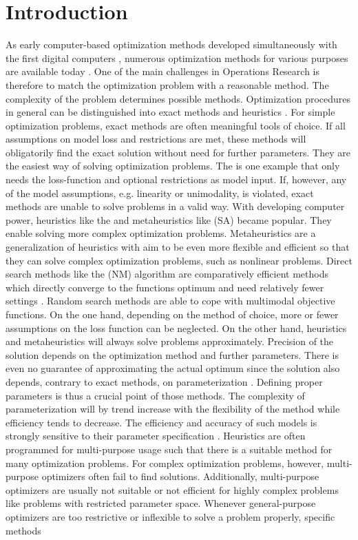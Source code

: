 \section{Introduction}
As early computer-based optimization methods developed simultaneously with the first digital computers \citep{corana_1987}, numerous optimization methods for various purposes are available today \citep{wegener_2005}. One of the main challenges in Operations Research is therefore to match the optimization problem with a reasonable method. The complexity of the problem determines possible methods. Optimization procedures in general can be distinguished into exact methods and heuristics \citep{kirkpatrick_1983}. For simple optimization problems, exact methods are often meaningful tools of choice. If all assumptions on model loss and restrictions are met, these methods will obligatorily find the exact solution without need for further parameters. They are the easiest way of solving optimization problems.  The  \citep{dantzig_1959} is  one example that only needs the loss-function and optional restrictions as model input. If, however, any of the model assumptions, e.g. linearity or unimodality, is violated, exact methods are unable to solve problems in a valid way. With developing computer power, heuristics like the   \citep{clarke_1964} and metaheuristics like  (SA) \citep{kirkpatrick_1983} became popular. They enable solving more complex optimization problems. Metaheuristics are a generalization of heuristics with aim to be even more flexible and efficient \citep{blum_2003} so that they can solve complex optimization problems, such as nonlinear problems. Direct search methods like the  (NM) algorithm are comparatively efficient methods which directly converge to the functions optimum and need relatively fewer settings \citep{geiger_1999}. Random search methods are able to cope with multimodal objective functions.  On the one hand, depending on the method   of choice, more or fewer assumptions on the loss function can be neglected. On the other hand, heuristics and metaheuristics will always solve problems approximately. Precision of the solution depends on the optimization method and further parameters. There is even no guarantee of approximating the actual optimum since the solution also depends, contrary to exact methods, on parameterization \citep{blum_2003}. Defining proper parameters is thus a crucial point of those methods. The complexity of parameterization will by trend increase with the flexibility of the method while efficiency tends to decrease. The efficiency and accuracy of such models is strongly sensitive to their parameter specification \citep{corana_1987}. Heuristics are often programmed for multi-purpose usage such that there is a suitable method for many optimization problems. For complex optimization problems, however, multi-purpose optimizers often fail to find solutions. Additionally, multi-purpose optimizers are usually not suitable or not efficient for highly complex problems like problems with restricted parameter space. Whenever general-purpose optimizers are too restrictive or inflexible to solve a problem properly, specific methods 